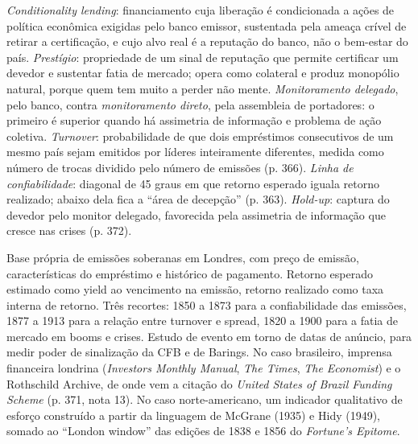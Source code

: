 \emph{Conditionality lending}: financiamento cuja liberação é condicionada a
ações de política econômica exigidas pelo banco emissor, sustentada pela ameaça
crível de retirar a certificação, e cujo alvo real é a reputação do banco, não o
bem-estar do país. \emph{Prestígio}: propriedade de um sinal de reputação que
permite certificar um devedor e sustentar fatia de mercado; opera como colateral
e produz monopólio natural, porque quem tem muito a perder não mente.
\emph{Monitoramento delegado}, pelo banco, contra \emph{monitoramento direto},
pela assembleia de portadores: o primeiro é superior quando há assimetria de
informação e problema de ação coletiva. \emph{Turnover}: probabilidade de que
dois empréstimos consecutivos de um mesmo país sejam emitidos por líderes
inteiramente diferentes, medida como número de trocas dividido pelo número de
emissões (p. 366). \emph{Linha de confiabilidade}: diagonal de 45 graus em que
retorno esperado iguala retorno realizado; abaixo dela fica a ``área de
decepção'' (p. 363). \emph{Hold-up}: captura do devedor pelo monitor delegado,
favorecida pela assimetria de informação que cresce nas crises (p. 372).

Base própria de emissões soberanas em Londres, com preço de emissão,
características do empréstimo e histórico de pagamento. Retorno esperado
estimado como yield ao vencimento na emissão, retorno realizado como taxa
interna de retorno. Três recortes: 1850 a 1873 para a confiabilidade das
emissões, 1877 a 1913 para a relação entre turnover e spread, 1820 a 1900 para a
fatia de mercado em booms e crises. Estudo de evento em torno de datas de
anúncio, para medir poder de sinalização da CFB e de Barings. No caso
brasileiro, imprensa financeira londrina (\emph{Investors Monthly Manual},
\emph{The Times}, \emph{The Economist}) e o Rothschild Archive, de onde vem a
citação do \emph{United States of Brazil Funding Scheme} (p. 371, nota 13). No
caso norte-americano, um indicador qualitativo de esforço construído a partir da
linguagem de McGrane (1935) e Hidy (1949), somado ao ``London window'' das
edições de 1838 e 1856 do \emph{Fortune's Epitome}.

